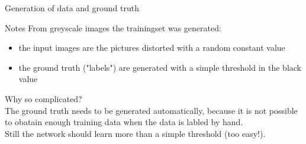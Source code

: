 \begin{frame}{Generation of data and ground truth}
\end{frame}

\begin{frame}[beamer:0]{Notes}
From greyscale images the trainingset was generated:
\begin{itemize}
\item the input images are the pictures distorted with a random constant value
\item the ground truth ("labels") are generated with a simple threshold in the black value
\end{itemize}
Why so complicated?\\
The ground truth needs to be generated automatically, because it is not possible to obatain enough training data when the data is labled by hand.\\
Still the network should learn more than a simple threshold (too easy!).
\end{frame}

